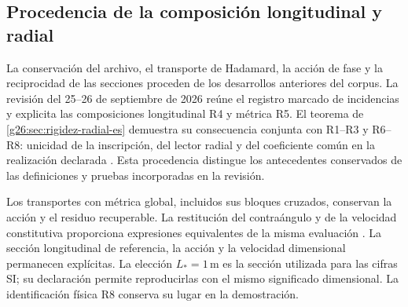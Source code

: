 \subsection{Procedencia de la composición longitudinal y radial}

La conservación del archivo, el transporte de Hadamard, la acción de
fase y la reciprocidad de las secciones proceden de los desarrollos
anteriores del corpus. La revisión del 25--26 de septiembre de 2026
reúne el registro marcado de incidencias y explicita las composiciones
longitudinal R4 y métrica R5. El teorema de
\ref{g26:sec:rigidez-radial-es} demuestra su consecuencia conjunta con
R1--R3 y R6--R8: unicidad de la inscripción, del lector radial y del
coeficiente común en la realización declarada \cite{hmtg26radial}.
Esta procedencia distingue los antecedentes conservados de las
definiciones y pruebas incorporadas en la revisión.

Los transportes con métrica global, incluidos sus bloques cruzados,
conservan la acción y el residuo recuperable. La restitución del
contraángulo y de la velocidad constitutiva proporciona expresiones
equivalentes de la misma evaluación \cite{hmtg26metric,hmtg26counter}.
La sección longitudinal de referencia, la acción y la velocidad
dimensional permanecen explícitas. La elección \(L_*=1\,\mathrm m\)
es la sección utilizada para las cifras SI; su declaración permite
reproducirlas con el mismo significado dimensional. La identificación
física R8 conserva su lugar en la demostración.
